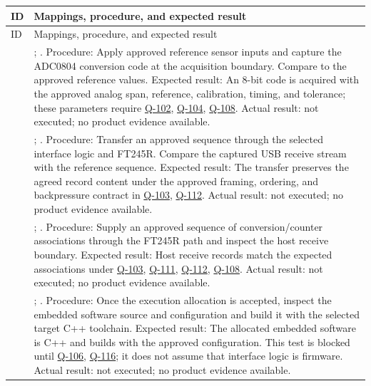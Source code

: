 \small
\begin{tabularx}{\linewidth}{L{2cm}Y}
\caption{Planned Test Cases\label{Table:ProjectTests}}\\
\toprule
ID & Mappings, procedure, and expected result\\\midrule
\endfirsthead
\toprule
ID & Mappings, procedure, and expected result\\\midrule
\endhead
\bottomrule
\endlastfoot
{} & ; . Procedure: Apply approved reference sensor inputs and capture the ADC0804 conversion code at the acquisition boundary. Compare to the approved reference values. Expected result: An 8-bit code is acquired with the approved analog span, reference, calibration, timing, and tolerance; these parameters require \hyperref[Question:Q-102]{Q-102}, \hyperref[Question:Q-104]{Q-104}, \hyperref[Question:Q-108]{Q-108}. Actual result: not executed; no product evidence available.\\
 & ; . Procedure: Transfer an approved sequence through the selected interface logic and FT245R. Compare the captured USB receive stream with the reference sequence. Expected result: The transfer preserves the agreed record content under the approved framing, ordering, and backpressure contract in \hyperref[Question:Q-103]{Q-103}, \hyperref[Question:Q-112]{Q-112}. Actual result: not executed; no product evidence available.\\
 & ; . Procedure: Supply an approved sequence of conversion/counter associations through the FT245R path and inspect the host receive boundary. Expected result: Host receive records match the expected associations under \hyperref[Question:Q-103]{Q-103}, \hyperref[Question:Q-111]{Q-111}, \hyperref[Question:Q-112]{Q-112}, \hyperref[Question:Q-108]{Q-108}. Actual result: not executed; no product evidence available.\\
 & ; . Procedure: Once the execution allocation is accepted, inspect the embedded software source and configuration and build it with the selected target C++ toolchain. Expected result: The allocated embedded software is C++ and builds with the approved configuration. This test is blocked until \hyperref[Question:Q-106]{Q-106}, \hyperref[Question:Q-116]{Q-116}; it does not assume that interface logic is firmware. Actual result: not executed; no product evidence available.\\

\end{tabularx}
